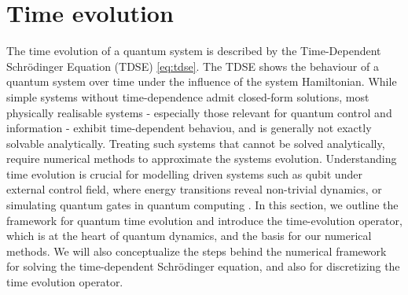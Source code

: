 \documentclass{subfiles}
\begin{document}
\section{Time evolution}\label{sec:time_evolution}
The time evolution of a quantum system is described by the Time-Dependent Schrödinger Equation (TDSE) \eqref{eq:tdse}. The TDSE shows the behaviour of a quantum system over time under the influence of the system Hamiltonian. While simple systems without time-dependence admit closed-form solutions, most physically realisable systems - especially those relevant for quantum control and information - exhibit time-dependent behaviou, and is generally not exactly solvable analytically. Treating such systems that cannot be solved analytically, require numerical methods to approximate the systems evolution. Understanding time evolution is crucial for modelling driven systems such as qubit under external control field, where energy transitions reveal non-trivial dynamics\cite{landau1932theorie, zener1932non}, or simulating quantum gates in quantum computing \cite{leinonen2024coulomb, nazir2005anticrossings}. In this section, we outline the framework for quantum time evolution and introduce the time-evolution operator, which is at the heart of quantum dynamics, and the basis for our numerical methods. We will also conceptualize the steps behind the numerical framework for solving the time-dependent Schrödinger equation, and also for discretizing the time evolution operator. \\
\end{document}
